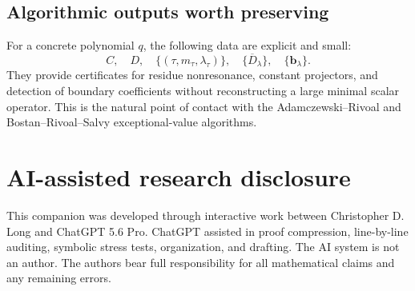 \documentclass[11pt]{article}
\numberwithin{equation}{section}
\theoremstyle{definition}
\theoremstyle{remark}
\begin{document}
\subsection{Algorithmic outputs worth preserving}

For a concrete polynomial $q$, the following data are explicit and small:
\[
  C,\quad D,\quad
  \{(\tau,m_\tau,\lambda_\tau)\},\quad
  \{\overline D_\lambda\},\quad
  \{\mathbf b_\lambda\}.
\]
They provide certificates for residue nonresonance, constant projectors, and
detection of boundary coefficients without reconstructing a large minimal
scalar operator.  This is the natural point of contact with the
Adamczewski--Rivoal and Bostan--Rivoal--Salvy exceptional-value algorithms.

\section*{AI-assisted research disclosure}

This companion was developed through interactive work between Christopher
D. Long and ChatGPT 5.6 Pro.  ChatGPT assisted in proof compression,
line-by-line auditing, symbolic stress tests, organization, and drafting.
The AI system is not an author.  The authors bear full responsibility
for all mathematical claims and any remaining errors.
\end{document}
